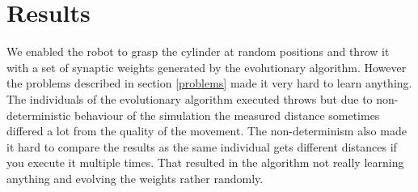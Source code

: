 \section{Results}
We enabled the robot to grasp the cylinder at random positions and throw it with a set of synaptic weights generated by the evolutionary algorithm.
However the problems described in section \ref{problems} made it very hard to learn anything.
The individuals of the evolutionary algorithm executed throws but due to non-deterministic behaviour of the simulation the measured distance sometimes differed a lot from the quality of the movement.
The non-determinism also made it hard to compare the results as the same individual gets different distances if you execute it multiple times.
That resulted in the algorithm not really learning anything and evolving the weights rather randomly.
\todo{}